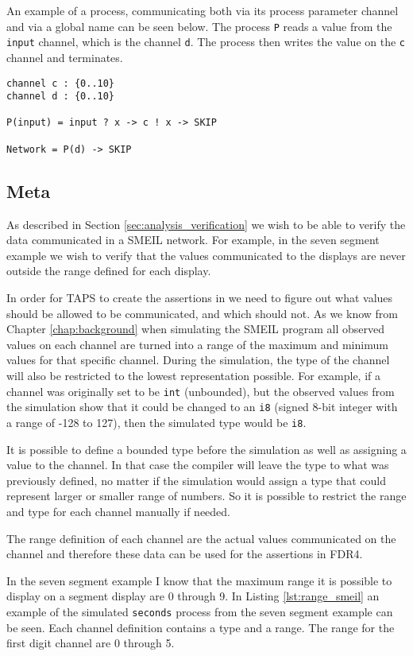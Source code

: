 An example of a \cspm{} process, communicating both via its process parameter channel and via a global name can be seen below. The process \texttt{P} reads a value from the \texttt{input} channel, which is the channel \texttt{d}. The process then writes the value on the \texttt{c} channel and terminates.
\begin{verbatim}
channel c : {0..10}
channel d : {0..10}

P(input) = input ? x -> c ! x -> SKIP

Network = P(d) -> SKIP
\end{verbatim}

\subsection{Meta}
As described in Section \ref{sec:analysis_verification} we wish to be able to verify the data communicated in a SMEIL network. For example, in the seven segment example we wish to verify that the values communicated to the displays are never outside the range defined for each display.

In order for TAPS to create the assertions in \cspm{} we need to figure out what values should be allowed to be communicated, and which should not.
As we know from Chapter \ref{chap:background} when simulating the SMEIL program all observed values on each channel are turned into a range of the maximum and minimum values for that specific channel. During the simulation, the type of the channel will also be restricted to the lowest representation possible. For example, if a channel was originally set to be \texttt{int} (unbounded), but the observed values from the simulation show that it could be changed to an \texttt{i8} (signed 8-bit integer with a range of -128 to 127), then the simulated type would be \texttt{i8}.

It is possible to define a bounded type before the simulation as well as assigning a value to the channel. In that case the compiler will leave the type to what was previously defined, no matter if the simulation would assign a type that could represent larger or smaller range of numbers. So it is possible to restrict the range and type for each channel manually if needed.

The range definition of each channel are the actual values communicated on the channel and therefore these data can be used for the assertions in FDR4.

In the seven segment example I know that the maximum range it is possible to display on a segment display are 0 through 9. In Listing \ref{lst:range_smeil} an example of the simulated \texttt{seconds} process from the seven segment example can be seen.
Each channel definition contains a type and a range. The range for the first digit channel are 0 through 5.

